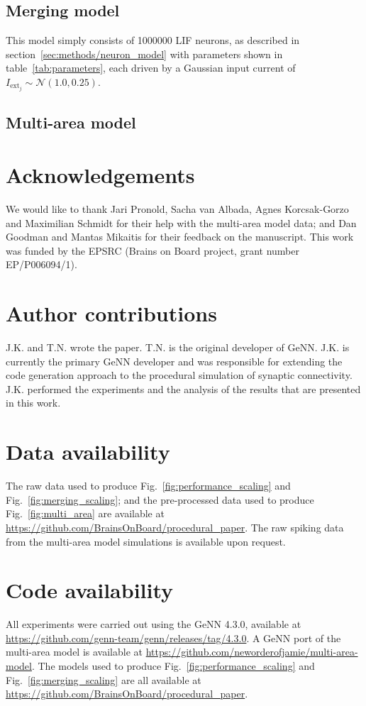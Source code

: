 \documentclass[9pt,a4paper]{amsart}
\begin{document}
\subsection{Merging model}
\label{sec:methods/merging}
This model simply consists of \num{1000000} LIF neurons, as described in section~\ref{sec:methods/neuron_model} with parameters shown in table~\ref{tab:parameters}, each driven by a Gaussian input current of $I_{\text{ext}_j} \sim \mathcal{N}(1.0, 0.25)$.
\subsection{Multi-area model}

\section{Acknowledgements}
We would like to thank Jari Pronold, Sacha van Albada, Agnes Korcsak-Gorzo and Maximilian Schmidt for their help with the multi-area model data; and Dan Goodman and Mantas Mikaitis for their feedback on the manuscript.
This work was funded by the EPSRC (Brains on Board project, grant number EP/P006094/1).

\section{Author contributions}
J.K. and T.N. wrote the paper.
T.N. is the original developer of GeNN.
J.K. is currently the primary GeNN developer and was responsible for extending the code generation approach to the procedural simulation of synaptic connectivity.
J.K. performed the experiments and the analysis of the results that are presented in this work.

\section{Data availability}
The raw data used to produce Fig.~\ref{fig:performance_scaling} and Fig.~\ref{fig:merging_scaling}; and the pre-processed data used to produce Fig.~\ref{fig:multi_area} are available at \url{https://github.com/BrainsOnBoard/procedural_paper}.
The raw spiking data from the multi-area model simulations is available upon request.

\section{Code availability}
All experiments were carried out using the GeNN 4.3.0, available at \url{https://github.com/genn-team/genn/releases/tag/4.3.0}.
A GeNN port of the multi-area model is available at \url{https://github.com/neworderofjamie/multi-area-model}.
The models used to produce Fig.~\ref{fig:performance_scaling} and Fig.~\ref{fig:merging_scaling} are all available at \url{https://github.com/BrainsOnBoard/procedural_paper}.



\end{document}
